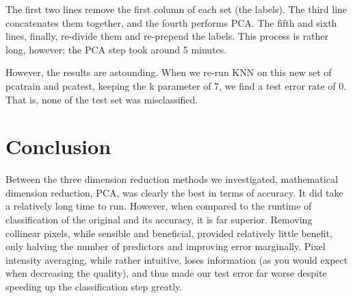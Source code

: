 \documentclass[10pt]{extarticle}
\begin{document}
The first two lines remove the first column of each set (the labels). The third line concatenates them together, and the fourth performs PCA. The fifth and sixth lines, finally, re-divide them and re-prepend the labels. This process is rather long, however; the PCA step took around 5 minutes. 

However, the results are astounding. When we re-run KNN on this new set of pcatrain and pcatest, keeping the k parameter of 7, we find a test error rate of 0. That is, none of the test set was misclassified. 

\section{Conclusion}
Between the three dimension reduction methods we investigated, mathematical dimension reduction, PCA, was clearly the best in terms of accuracy. It did take a relatively long time to run. However, when compared to the runtime of classification of the original and its accuracy, it is far superior. Removing collinear pixels, while sensible and beneficial, provided relatively little benefit, only halving the number of predictors and improving error marginally. Pixel intensity averaging, while rather intuitive, loses information (as you would expect when decreasing the quality), and thus made our test error far worse despite speeding up the classification step greatly. 


\blank 
\end{document}
